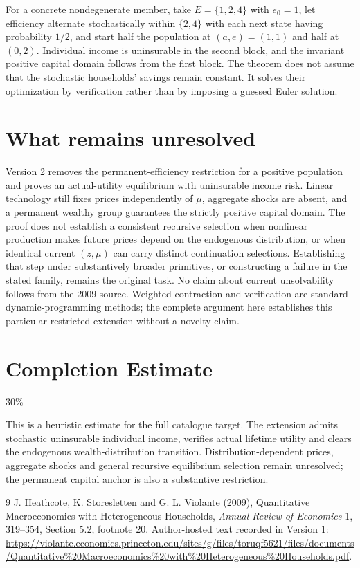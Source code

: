 \documentclass[11pt]{article}
\theoremstyle{definition}
\begin{document}
For a concrete nondegenerate member, take $E=\{1,2,4\}$ with $e_0=1$,
let efficiency alternate stochastically within $\{2,4\}$ with each next
state having probability $1/2$, and start half the population at
$(a,e)=(1,1)$ and half at $(0,2)$. Individual income is uninsurable in
the second block, and the invariant positive capital domain follows
from the first block. The theorem does not assume that the stochastic
households' savings remain constant. It solves their optimization by
verification rather than by imposing a guessed Euler solution.

\section*{What remains unresolved}
Version 2 removes the permanent-efficiency restriction for a positive population and proves an actual-utility equilibrium with uninsurable income risk. Linear technology still fixes prices independently of $\mu$, aggregate shocks are absent, and a permanent wealthy group guarantees the strictly positive capital domain. The proof does not establish a consistent recursive selection when nonlinear production makes future prices depend on the endogenous distribution, or when identical current $(z,\mu)$ can carry distinct continuation selections. Establishing that step under substantively broader primitives, or constructing a failure in the stated family, remains the original task. No claim about current unsolvability follows from the 2009 source. Weighted contraction and verification are standard dynamic-programming methods; the complete argument here establishes this particular restricted extension without a novelty claim.
\section{Completion Estimate}
30\%

This is a heuristic estimate for the full catalogue target.
The extension admits stochastic uninsurable individual income, verifies actual lifetime utility and clears the endogenous wealth-distribution transition. Distribution-dependent prices, aggregate shocks and general recursive equilibrium selection remain unresolved; the permanent capital anchor is also a substantive restriction.

\begin{thebibliography}{9}
 J. Heathcote, K. Storesletten and G. L. Violante (2009), Quantitative Macroeconomics with Heterogeneous Households, \emph{Annual Review of Economics} 1, 319--354, Section 5.2, footnote 20. Author-hosted text recorded in Version 1: \url{https://violante.economics.princeton.edu/sites/g/files/toruqf5621/files/documents/Quantitative\%20Macroeconomics\%20with\%20Heterogeneous\%20Households.pdf}.
\end{thebibliography}
\end{document}
